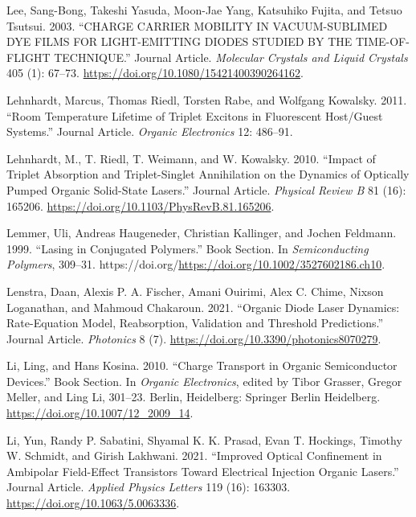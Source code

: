 \documentclass[
  letterpaper,
  DIV=11,
  numbers=noendperiod,
  oneside]{scrreprt}
\newlength{\cslhangindent}
\newlength{\cslentryspacingunit} %
\newenvironment{CSLReferences}[2] %
 {%
  \setlength{\parindent}{0pt}
  \ifodd #1
  \let\oldpar\par
  \def\par{\hangindent=\cslhangindent\oldpar}
  \fi
  \setlength{\parskip}{#2\cslentryspacingunit}
 }%
 {}
\begin{document}
\begin{CSLReferences}{1}{0}
\leavevmode{}%
Lee, Sang-Bong, Takeshi Yasuda, Moon-Jae Yang, Katsuhiko Fujita, and
Tetsuo Tsutsui. 2003. {``CHARGE CARRIER MOBILITY IN VACUUM-SUBLIMED DYE
FILMS FOR LIGHT-EMITTING DIODES STUDIED BY THE TIME-OF-FLIGHT
TECHNIQUE.''} Journal Article. \emph{Molecular Crystals and Liquid
Crystals} 405 (1): 67--73.
\url{https://doi.org/10.1080/15421400390264162}.

\leavevmode{}%
Lehnhardt, Marcus, Thomas Riedl, Torsten Rabe, and Wolfgang Kowalsky.
2011. {``Room Temperature Lifetime of Triplet Excitons in Fluorescent
Host/Guest Systems.''} Journal Article. \emph{Organic Electronics} 12:
486--91.

\leavevmode{}%
Lehnhardt, M., T. Riedl, T. Weimann, and W. Kowalsky. 2010. {``Impact of
Triplet Absorption and Triplet-Singlet Annihilation on the Dynamics of
Optically Pumped Organic Solid-State Lasers.''} Journal Article.
\emph{Physical Review B} 81 (16): 165206.
\url{https://doi.org/10.1103/PhysRevB.81.165206}.

\leavevmode{}%
Lemmer, Uli, Andreas Haugeneder, Christian Kallinger, and Jochen
Feldmann. 1999. {``Lasing in Conjugated Polymers.''} Book Section. In
\emph{Semiconducting Polymers}, 309--31.
https://doi.org/\url{https://doi.org/10.1002/3527602186.ch10}.

\leavevmode{}%
Lenstra, Daan, Alexis P. A. Fischer, Amani Ouirimi, Alex C. Chime,
Nixson Loganathan, and Mahmoud Chakaroun. 2021. {``Organic Diode Laser
Dynamics: Rate-Equation Model, Reabsorption, Validation and Threshold
Predictions.''} Journal Article. \emph{Photonics} 8 (7).
\url{https://doi.org/10.3390/photonics8070279}.

\leavevmode{}%
Li, Ling, and Hans Kosina. 2010. {``Charge Transport in Organic
Semiconductor Devices.''} Book Section. In \emph{Organic Electronics},
edited by Tibor Grasser, Gregor Meller, and Ling Li, 301--23. Berlin,
Heidelberg: Springer Berlin Heidelberg.
\url{https://doi.org/10.1007/12_2009_14}.

\leavevmode{}%
Li, Yun, Randy P. Sabatini, Shyamal K. K. Prasad, Evan T. Hockings,
Timothy W. Schmidt, and Girish Lakhwani. 2021. {``Improved Optical
Confinement in Ambipolar Field-Effect Transistors Toward Electrical
Injection Organic Lasers.''} Journal Article. \emph{Applied Physics
Letters} 119 (16): 163303. \url{https://doi.org/10.1063/5.0063336}.


\end{CSLReferences}
\end{document}
